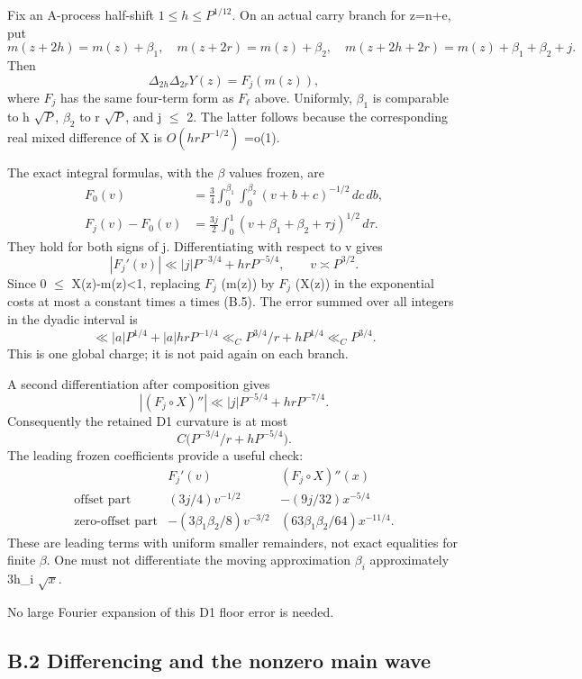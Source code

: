 \documentclass[11pt,a4paper]{article}
\begin{document}
Fix an A-process half-shift \(1\le h\le P^{1/12}\). On an actual carry
branch for z=n+e, put \[
m(z+2h)=m(z)+\beta_1,\quad
m(z+2r)=m(z)+\beta_2,\quad
m(z+2h+2r)=m(z)+\beta_1+\beta_2+j.
\] Then \[
\Delta_{2h}\Delta_{2r}Y(z)=F_j(m(z)),
\] where \(F_j\) has the same four-term form as \(F_\ell\) above.
Uniformly, \(\beta_1\) is comparable to h \(\sqrt{P}\), \(\beta_2\) to r
\(\sqrt{P}\), and \textbar j\textbar{} \(\le\) 2. The latter follows
because the corresponding real mixed difference of X is
\(O(hr P^{-1/2})\) =o(1).

The exact integral formulas, with the \(\beta\) values frozen, are \[
\begin{split}
F_0(v)&=\tfrac34\int_0^{\beta_1}\int_0^{\beta_2}
(v+b+c)^{-1/2}\,dc\,db,\\
F_j(v)-F_0(v)&=\tfrac{3j}{2}\int_0^1
(v+\beta_1+\beta_2+\tau j)^{1/2}\,d\tau .
\end{split} \tag{B.4}
\] They hold for both signs of j. Differentiating with respect to v
gives \[
|F_j'(v)|\ll |j|P^{-3/4}+hrP^{-5/4},\qquad v\asymp P^{3/2}. \tag{B.5}
\] Since 0 \(\le\) X(z)-m(z)\textless1, replacing \(F_j\) (m(z)) by
\(F_j\) (X(z)) in the exponential costs at most a constant times
\textbar a\textbar{} times (B.5). The error summed over all integers in
the dyadic interval is \[
\ll |a|P^{1/4}+|a|hrP^{-1/4}
\ll_C P^{3/4}/r+hP^{1/4}
\ll_C P^{3/4}. \tag{B.6}
\] This is one global charge; it is not paid again on each branch.

A second differentiation after composition gives \[
|(F_j\circ X)''|\ll |j|P^{-5/4}+hrP^{-7/4}.
\] Consequently the retained D1 curvature is at most \[
C\big(P^{-3/4}/r+hP^{-5/4}\big). \tag{B.7}
\] The leading frozen coefficients provide a useful check: \[
\begin{array}{c|cc}
& F_j'(v) & (F_j\circ X)''(x)\\ \hline
\text{offset part} & (3j/4)v^{-1/2} & -(9j/32)x^{-5/4}\\
\text{zero-offset part} & -(3\beta_1\beta_2/8)v^{-3/2}
& (63\beta_1\beta_2/64)x^{-11/4}.
\end{array}
\] These are leading terms with uniform smaller remainders, not exact
equalities for finite \(\beta\). One must not differentiate the moving
approximation \(\beta_i\) approximately 3h\_i \(\sqrt{x}\).

No large Fourier expansion of this D1 floor error is needed.

\subsection{B.2 Differencing and the nonzero main
wave}\label{b.2-differencing-and-the-nonzero-main-wave}
\end{document}
